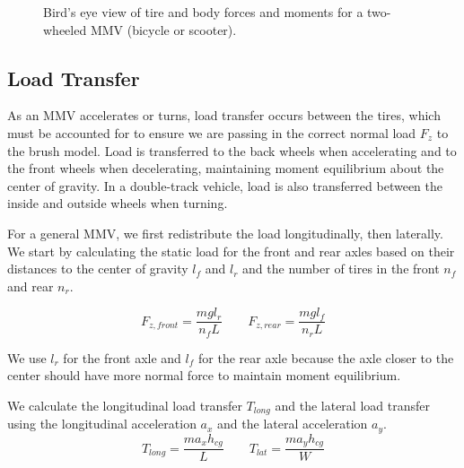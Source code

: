 \documentclass[letterpaper, 10 pt, conference]{ieeeconf}  %
\begin{document}
\begin{figure}[h!]
    \caption{Bird's eye view of tire and body forces and moments for a two-wheeled MMV (bicycle or scooter).}
    \label{fig:vehicle}
    \vspace*{-1em}
\end{figure}

\subsection{Load Transfer}
As an MMV accelerates or turns, load transfer occurs between the tires, which must be accounted for to ensure we are passing in the correct normal load $F_z$ to the brush model. Load is transferred to the back wheels when accelerating and to the front wheels when decelerating, maintaining moment equilibrium about the center of gravity. In a double-track vehicle, load is also transferred between the inside and outside wheels when turning. 

For a general MMV, we first redistribute the load longitudinally, then laterally. We start by calculating the static load for the front and rear axles based on their distances to the center of gravity $l_f$ and $l_r$ and the number of tires in the front $n_{f}$ and rear $n_r$. 

\begin{equation}
    F_{z,front} = \frac{mgl_r}{n_{f}L} \qquad 
    F_{z,rear} = \frac{mgl_f}{n_{r}L}
\end{equation}

We use $l_r$ for the front axle and $l_f$ for the rear axle because the axle closer to the center should have more normal force to maintain moment equilibrium.

We calculate the longitudinal load transfer $T_{long}$ and the lateral load transfer using the longitudinal acceleration $a_x$ and the lateral acceleration $a_y$.
\begin{equation}
    T_{long} = \frac{m a_x h_{cg}}{L} \qquad
    T_{lat} = \frac{m a_y h_{cg}}{W}
\end{equation}
    
\end{document}
